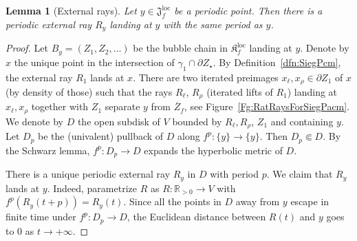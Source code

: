 \documentclass[]{amsart}
\newcommand\Jul{{\mathfrak J}}
\newcommand\Kfilled{{\mathfrak K}}
\newcommand{\str}{{\star}}
\newcommand{\R}{\mathbb{R}}
\newtheorem{lem}[thm]{Lemma}
\theoremstyle{remark}
\numberwithin{equation}{section}
\theoremstyle{definition}
\def\loc{{\mathrm{loc}}}
\begin{document}
\begin{lem}[External rays]
\label{lem:SP ExternalRays}
Let $y\in \Jul^\loc_f$ be a periodic point. Then there is a periodic external ray $R_y$ landing at $y$ with the same period as $y$. 
\end{lem}
\begin{proof}
Let $B_y=(Z_1,Z_2,\dots)$ be the bubble chain in $\Kfilled^\loc_f$ landing at $y$. Denote by $x$ the unique point in the intersection of $\gamma_1\cap \partial Z_\str$. By Definition~\ref{dfn:SiegPcm}, the external ray $R_1$ lands at $x$. There are two iterated preimages $x_\ell, x_{\rho}\in \partial Z_1$ of $x$ (by density of those) such that the rays $R_\ell$, $R_\rho$ (iterated lifts of $R_1$) landing at $x_\ell,x_\rho$ 
 together with $Z_1$ separate $y$ from $\overline Z_f$, see Figure~\ref{Fg:RatRaysForSiegPacm}. We denote by $D$ the open subdisk of $V$  bounded by $R_\ell, R_\rho$, $Z_1$ and containing $y$. 
 Let $D_p$ be the (univalent) pullback of $D$ along $f^p \colon \{y\}\to \{y\}$. Then $D_p\Subset D$. By the Schwarz lemma, $f^p\colon D_p\to D$ expands the hyperbolic metric of $D$. 
 
There is a unique periodic external ray  $R_y$ in $D$ with period $p$. We claim that $R_y$ lands at $y$. Indeed, parametrize $R$ as $R\colon \R_{>0}\to V$ with $f^p(R_y(t+p))= R_y(t)$. Since all the points in $D$ away from $y$ escape in finite time under $f^p\colon D_p\to D$, the Euclidean distance between $R(t)$ and $y$ goes to $0$ as $t\to +\infty$.
\end{proof}
\end{document}

